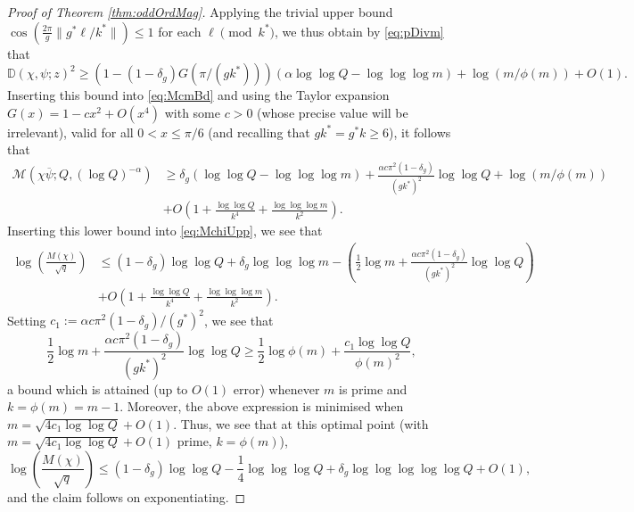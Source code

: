 \documentclass[10pt]{amsart}
\theoremstyle{definition}
\newcommand{\mc}{\mathcal}
\newcommand{\mb}{\mathbb}
\renewcommand{\bar}{\overline}
\begin{document}
\begin{proof}[Proof of Theorem \ref{thm:oddOrdMag}]
Applying the trivial upper bound $\cos(\tfrac{2\pi}{g}\|g^\ast \ell/k^\ast\|) \leq 1$ for each $\ell \pmod{k^\ast}$, we thus obtain by \eqref{eq:pDivm} that
$$
\mb{D}(\chi,\psi;z)^2 \geq \left(1-(1-\delta_g)G(\pi/(gk^\ast))\right) (\alpha \log\log Q- \log\log\log m) + \log(m/\phi(m)) + O(1). 
$$
Inserting this bound into \eqref{eq:McmBd} and using the Taylor expansion $G(x) = 1 - cx^2 + O(x^4)$ with some $c > 0$ (whose precise value will be irrelevant), valid for all $0 < x \leq \pi/6$ (and recalling that $gk^\ast = g^\ast k \geq 6$), it follows that
\begin{align*}
\mc{M}(\chi\bar{\psi}; Q,(\log Q)^{-\alpha}) &\geq \delta_g (\log\log Q- \log\log\log m) + \frac{\alpha c\pi^2(1-\delta_g)}{(gk^\ast)^2} \log\log Q + \log(m/\phi(m)) \\
&+ O\left(1+\frac{\log\log Q}{k^4} + \frac{\log\log\log m}{k^2}\right).
\end{align*}
Inserting this lower bound into \eqref{eq:MchiUpp}, we see that
\begin{align*}
\log\left(\frac{M(\chi)}{\sqrt{q}}\right) &\leq (1-\delta_g) \log\log Q  + \delta_g \log\log\log m - \left(\frac{1}{2} \log m + \frac{\alpha c\pi^2(1-\delta_g)}{(gk^\ast)^2}\log\log Q\right) \\
&+ O\left(1 + \frac{\log\log Q}{k^4} + \frac{\log\log\log m}{k^2}\right).
\end{align*}
Setting $c_1 := \alpha c \pi^2 (1-\delta_g)/(g^{\ast})^2$, we see that 
$$
\frac{1}{2} \log m + \frac{\alpha c\pi^2(1-\delta_g)}{(gk^\ast)^2}\log\log Q \geq \frac{1}{2} \log \phi(m) + \frac{c_1 \log\log Q}{\phi(m)^2},
$$
a bound which is attained (up to $O(1)$ error) whenever $m$ is prime and $k = \phi(m) = m-1$.  Moreover, the above expression is minimised when $m = \sqrt{4c_1\log\log Q} + O(1)$. Thus, we see that at this optimal point (with $m = \sqrt{4c_1\log\log Q} + O(1)$ prime, $k = \phi(m)$),
$$
\log\left(\frac{M(\chi)}{\sqrt{q}}\right) \leq  (1-\delta_g) \log\log Q - \frac{1}{4} \log\log \log Q + \delta_g \log\log\log \log\log Q + O(1),
$$
and the claim follows on exponentiating.
\end{proof}
\end{document}
